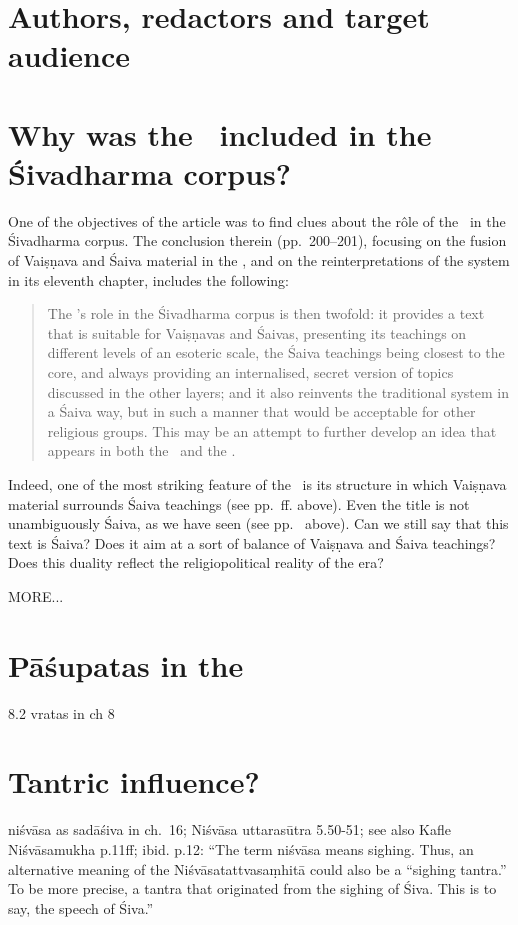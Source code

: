 \section{Authors, redactors and target audience}


\section{Why was the \VSS\ included in the Śivadharma corpus?}

One of the objectives of the article 
 was
to find clues about the r\^ole of the \VSS\ in the Śivadharma corpus.
The conclusion  therein (pp.~200--201), focusing on the fusion of 
Vaiṣṇava and Śaiva material in the \VSS, and on the reinterpretations of 
the  system in its eleventh chapter, includes the following:

\begin{quote}
The \Vss's role in the Śivadharma corpus is then twofold: 
it provides a text that is suitable for Vaiṣṇavas and Śaivas,
presenting its teachings on different levels of an esoteric scale, 
the Śaiva teachings being closest to the core, and always
providing an internalised, secret version of topics 
discussed in the other layers; and it also reinvents the traditional 
 system in a Śaiva way,
but in such a manner that would be acceptable for other religious groups. 
This may be an attempt to further develop an idea that appears in both 
the \SDhS\ and the \SDhU.
\end{quote}

\noindent
Indeed, one of the most striking feature of the \VSS\
is its structure in which Vaiṣṇava material surrounds
Śaiva teachings (see pp.~\pageref{structure}\thinspace ff. above). 
Even the title is not unambiguously Śaiva, as
we have seen (see pp.~\pageref{title} above).
Can we still say that this text is Śaiva? Does it
aim at a sort of balance of Vaiṣṇava and Śaiva
teachings? Does this duality reflect the 
religio\-political reality of the era?

MORE...

\section{Pāśupatas in the \VSS}

8.2
vratas in ch 8

\section{Tantric influence?}
niśvāsa as sadāśiva in ch.~16; Niśvāsa uttarasūtra 5.50-51; see also Kafle Niśvāsamukha p.11ff; ibid. p.12: ``The term niśvāsa means sighing. Thus, an alternative meaning of the Niśvāsatattvasaṃhitā could also be a ``sighing tantra.'' To be more precise, a tantra that originated from the sighing of Śiva. This is to say, the speech of Śiva.''


